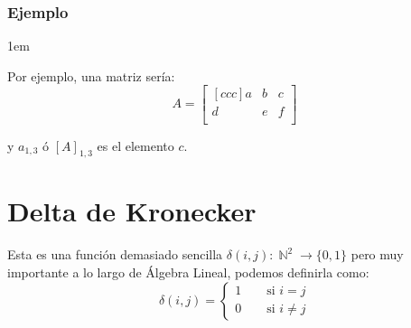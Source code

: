 \documentclass[12pt, fleqn]{report}                             %
\newenvironment{SmallIndentation}[1][0.75em]                    %
        {\begin{adjustwidth}{#1}{}\begin{footnotesize}}             %
        {\end{footnotesize}\end{adjustwidth}}                       %
\DeclareMathOperator \Space {\quad}                             %
\theoremstyle{break}                                            %
\DeclareMathOperator \Naturals     {\mathbb{N}}                 %
\begin{document}
            \subsubsection*{Ejemplo}
                \begin{SmallIndentation}[1em]
                    
                    Por ejemplo, una matriz sería:
                    \begin{equation*}
                        A =
                        \begin{bmatrix}[ccc]
                            a & b & c   \\
                            d & e & f   \\
                        \end{bmatrix}
                    \end{equation*}

                    y $a_{1,3}$ ó $[A]_{1, 3}$ es el elemento $c$.
                
                \end{SmallIndentation}
                


        \vspace{1em}
        \section{Delta de Kronecker}

            Esta es una función demasiado sencilla $\delta(i,j): \Naturals^2 \to \{0,1\}$
            pero muy importante a lo largo de Álgebra Lineal, podemos definirla como:
            \begin{equation*}
                \delta(i,j) =
                \begin{cases}
                    1 \Space \text{ si } i = j      \\
                    0 \Space \text{ si } i \neq j
                \end{cases}
            \end{equation*}



        \clearpage
\end{document}
